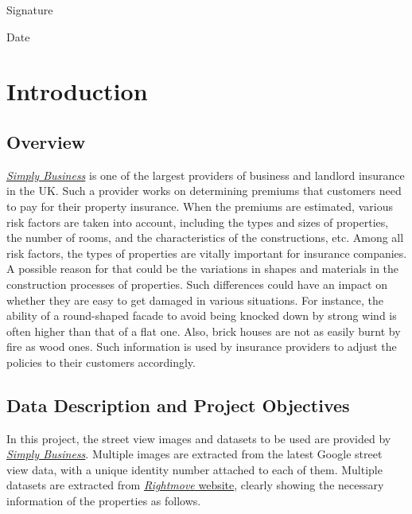 \documentclass[11pt,twoside]{article}
\numberwithin{Theorem}{section}
\numberwithin{Definition}{section}
\numberwithin{Lemma}{section}
\numberwithin{Algorithm}{section}
\numberwithin{equation}{section}
\newcommand{\dottedline}[1]{\makebox[#1]{.\dotfill}}
\begin{document}
Signature \dottedline{8cm}

\vspace{5mm}

Date \dottedline{8cm}


\clearpage



\pagestyle{plain}
\setcounter{page}{1}

\tableofcontents
\clearpage
\listoftables
\listoffigures
\cleardoublepage

\setcounter{page}{1}

\nocite{*}

\clearpage

\section{Introduction}
\label{sec:intro}
\subsection{Overview}
\href{https://www.simplybusiness.co.uk/}{\textit{Simply Business}} is one of the largest providers of business and landlord insurance in the UK. Such a provider works on determining premiums that customers need to pay for their property insurance. When the premiums are estimated, various risk factors are taken into account, including the types and sizes of properties, the number of rooms, and the characteristics of the constructions, etc. Among all risk factors, the types of properties are vitally important for insurance companies. A possible reason for that could be the variations in shapes and materials in the construction processes of properties. Such differences could have an impact on whether they are easy to get damaged in various situations. For instance, the ability of a round-shaped facade to avoid being knocked down by strong wind is often higher than that of a flat one. Also, brick houses are not as easily burnt by fire as wood ones. Such information is used by insurance providers to adjust the policies to their customers accordingly.

\subsection{Data Description and Project Objectives}
In this project, the street view images and datasets to be used are provided by \href{https://www.simplybusiness.co.uk/}{\textit{Simply Business}}. Multiple images are extracted from the latest Google street view data, with a unique identity number attached to each of them. Multiple datasets are extracted from \href{https://www.rightmove.co.uk/}{\textit{Rightmove} website}, clearly showing the necessary information of the properties as follows.
\end{document}
